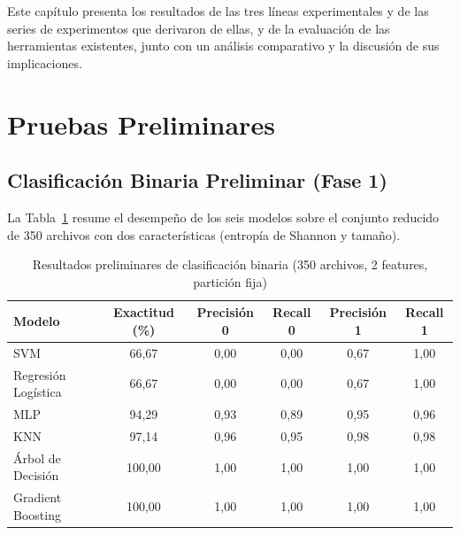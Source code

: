 
Este capítulo presenta los resultados de las tres líneas experimentales y de las series de experimentos que derivaron de ellas, y de la evaluación de las herramientas existentes, junto con un análisis comparativo y la discusión de sus implicaciones.

\section{Pruebas Preliminares}
\label{sec:resultados_preliminares}

\subsection{Clasificación Binaria Preliminar (Fase 1)}

La Tabla~\ref{tab:res_prelim_bin} resume el desempeño de los seis modelos sobre el conjunto reducido de 350 archivos con dos características (entropía de Shannon y tamaño).

\begin{table}[ht]
\centering
\caption{Resultados preliminares de clasificación binaria (350 archivos, 2 features, partición fija)}
\label{tab:res_prelim_bin}
\begin{tabular}{|l|c|c|c|c|c|}
\hline
\textbf{Modelo} & \textbf{Exactitud (\%)} & \textbf{Precisión 0} & \textbf{Recall 0} & \textbf{Precisión 1} & \textbf{Recall 1} \\ \hline
SVM & 66,67 & 0,00 & 0,00 & 0,67 & 1,00 \\ \hline
Regresión Logística & 66,67 & 0,00 & 0,00 & 0,67 & 1,00 \\ \hline
MLP & 94,29 & 0,93 & 0,89 & 0,95 & 0,96 \\ \hline
KNN & 97,14 & 0,96 & 0,95 & 0,98 & 0,98 \\ \hline
Árbol de Decisión & 100,00 & 1,00 & 1,00 & 1,00 & 1,00 \\ \hline
Gradient Boosting & 100,00 & 1,00 & 1,00 & 1,00 & 1,00 \\ \hline
\end{tabular}
\end{table}

